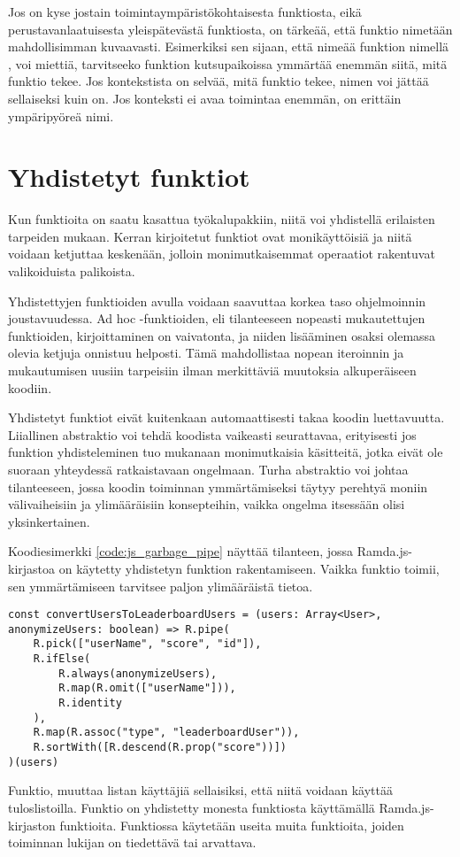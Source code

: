 Jos on kyse jostain toimintaympäristökohtaisesta funktiosta, eikä perustavanlaatuisesta yleispätevästä funktiosta, on tärkeää, että funktio nimetään mahdollisimman kuvaavasti. Esimerkiksi sen sijaan, että nimeää funktion nimellä , voi miettiä, tarvitseeko funktion kutsupaikoissa ymmärtää enemmän siitä, mitä funktio tekee. Jos kontekstista on selvää, mitä funktio tekee, nimen voi jättää sellaiseksi kuin on. Jos konteksti ei avaa toimintaa enemmän,  on erittäin ympäripyöreä nimi.

\section{Yhdistetyt funktiot}

Kun funktioita on saatu kasattua työkalupakkiin, niitä voi yhdistellä erilaisten tarpeiden mukaan. Kerran kirjoitetut funktiot ovat monikäyttöisiä ja niitä voidaan ketjuttaa keskenään, jolloin monimutkaisemmat operaatiot rakentuvat valikoiduista palikoista.

Yhdistettyjen funktioiden avulla voidaan saavuttaa korkea taso ohjelmoinnin joustavuudessa. Ad hoc -funktioiden, eli tilanteeseen nopeasti mukautettujen funktioiden, kirjoittaminen on vaivatonta, ja niiden lisääminen osaksi olemassa olevia ketjuja onnistuu helposti. Tämä mahdollistaa nopean iteroinnin ja mukautumisen uusiin tarpeisiin ilman merkittäviä muutoksia alkuperäiseen koodiin.

Yhdistetyt funktiot eivät kuitenkaan automaattisesti takaa koodin luettavuutta. Liiallinen abstraktio voi tehdä koodista vaikeasti seurattavaa, erityisesti jos funktion yhdisteleminen tuo mukanaan monimutkaisia käsitteitä, jotka eivät ole suoraan yhteydessä ratkaistavaan ongelmaan. Turha abstraktio voi johtaa tilanteeseen, jossa koodin toiminnan ymmärtämiseksi täytyy perehtyä moniin välivaiheisiin ja ylimääräisiin konsepteihin, vaikka ongelma itsessään olisi yksinkertainen.

Koodiesimerkki \ref{code:js_garbage_pipe} näyttää tilanteen, jossa Ramda.js-kirjastoa on käytetty yhdistetyn funktion rakentamiseen. Vaikka funktio toimii, sen ymmärtämiseen tarvitsee paljon ylimääräistä tietoa.

\begin{code}
    \begin{verbatim}
const convertUsersToLeaderboardUsers = (users: Array<User>, anonymizeUsers: boolean) => R.pipe(
    R.pick(["userName", "score", "id"]),
    R.ifElse(
        R.always(anonymizeUsers), 
        R.map(R.omit(["userName"])), 
        R.identity
    ),
    R.map(R.assoc("type", "leaderboardUser")),
    R.sortWith([R.descend(R.prop("score"))])
)(users)
\end{verbatim}
    \caption{Funktio, muuttaa listan käyttäjiä sellaisiksi, että niitä voidaan käyttää tuloslistoilla. Funktio on yhdistetty monesta funktiosta käyttämällä Ramda.js-kirjaston funktioita. Funktiossa käytetään useita muita funktioita, joiden toiminnan lukijan on tiedettävä tai arvattava.}
    \label{code:js_garbage_pipe}
\end{code}

